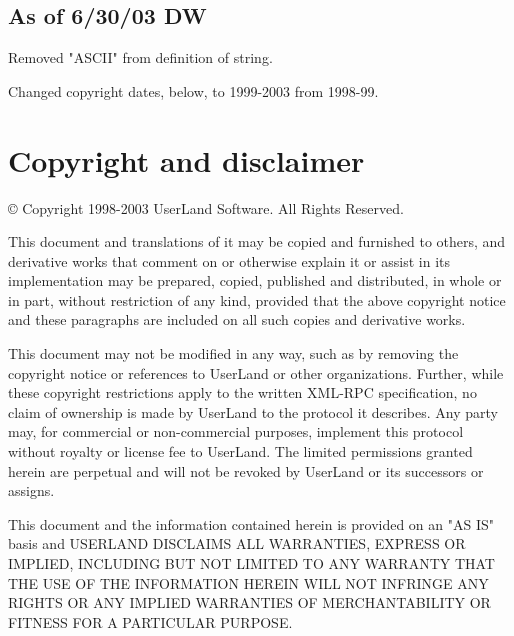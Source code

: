 \documentclass[10pt]{article}
\begin{document}
\subsection{As of 6/30/03 DW}

Removed "ASCII" from definition of string.

Changed copyright dates, below, to 1999-2003 from 1998-99.


%
%

\section{Copyright and disclaimer}

{\copyright} Copyright 1998-2003 UserLand Software. All Rights Reserved.

This document and translations of it may be copied and furnished to others, and derivative works that comment on or otherwise explain it or assist in its implementation may be prepared, copied, published and distributed, in whole or in part, without restriction of any kind, provided that the above copyright notice and these paragraphs are included on all such copies and derivative works.

This document may not be modified in any way, such as by removing the copyright notice or references to UserLand or other organizations. Further, while these copyright restrictions apply to the written XML-RPC specification, no claim of ownership is made by UserLand to the protocol it describes. Any party may, for commercial or non-commercial purposes, implement this protocol without royalty or license fee to UserLand. The limited permissions granted herein are perpetual and will not be revoked by UserLand or its successors or assigns.

This document and the information contained herein is provided on an "AS IS" basis and USERLAND DISCLAIMS ALL WARRANTIES, EXPRESS OR IMPLIED, INCLUDING BUT NOT LIMITED TO ANY WARRANTY THAT THE USE OF THE INFORMATION HEREIN WILL NOT INFRINGE ANY RIGHTS OR ANY IMPLIED WARRANTIES OF MERCHANTABILITY OR FITNESS FOR A PARTICULAR PURPOSE.
\end{document}
